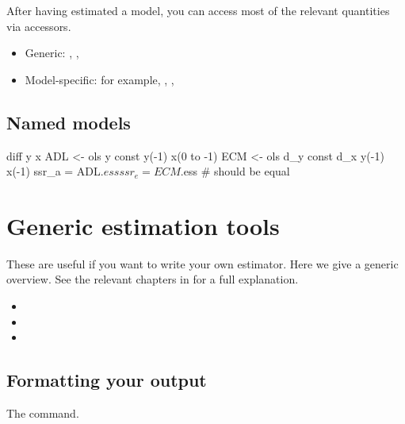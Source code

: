 After having estimated a model, you can access most of the relevant
quantities via accessors.

\begin{itemize}
\item Generic: , , 
\item Model-specific: for example, , ,
\end{itemize}

\subsection{Named models}

\begin{code}
diff y x
ADL <- ols y const y(-1) x(0 to -1)
ECM <- ols d_y const d_x y(-1) x(-1)
ssr_a = ADL.$ess
ssr_e = ECM.$ess # should be equal
\end{code}

\section{Generic estimation tools}
\label{sec:est-blocks}

These are useful if you want to write your own estimator. Here we give
a generic overview. See the relevant chapters in \GUG{} for a full explanation.

\begin{itemize}
\item {}
\item {}
\item {}
\end{itemize}

\subsection{Formatting your output}

The  command.

